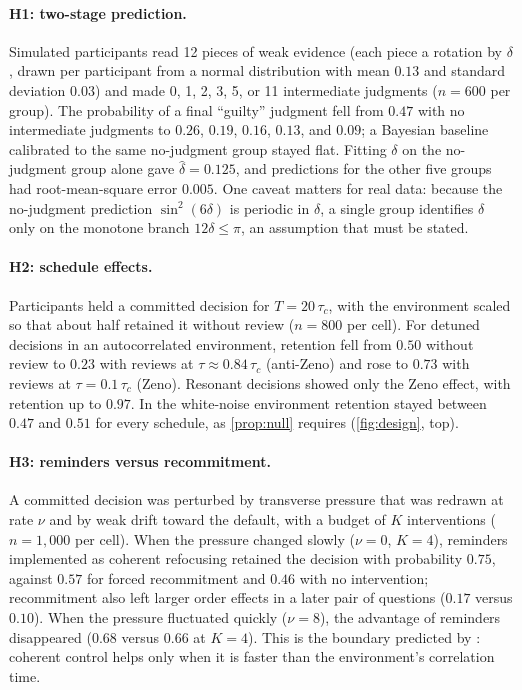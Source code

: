 \documentclass[11pt]{article}
\theoremstyle{definition}
\theoremstyle{remark}
\begin{document}
\paragraph{H1: two-stage prediction.} Simulated participants read 12 pieces of weak evidence (each piece a rotation by $\delta$, drawn per participant from a normal distribution with mean $0.13$ and standard deviation $0.03$) and made 0, 1, 2, 3, 5, or 11 intermediate judgments ($n=600$ per group). The probability of a final ``guilty'' judgment fell from $0.47$ with no intermediate judgments to $0.26$, $0.19$, $0.16$, $0.13$, and $0.09$; a Bayesian baseline calibrated to the same no-judgment group stayed flat. Fitting $\delta$ on the no-judgment group alone gave $\hat\delta=0.125$, and predictions for the other five groups had root-mean-square error $0.005$. One caveat matters for real data: because the no-judgment prediction $\sin^2(6\delta)$ is periodic in $\delta$, a single group identifies $\delta$ only on the monotone branch $12\delta\le\pi$, an assumption that must be stated.

\paragraph{H2: schedule effects.} Participants held a committed decision for $T=20\,\tau_c$, with the environment scaled so that about half retained it without review ($n=800$ per cell). For detuned decisions in an autocorrelated environment, retention fell from $0.50$ without review to $0.23$ with reviews at $\tau\approx0.84\,\tau_c$ (anti-Zeno) and rose to $0.73$ with reviews at $\tau=0.1\,\tau_c$ (Zeno). Resonant decisions showed only the Zeno effect, with retention up to $0.97$. In the white-noise environment retention stayed between $0.47$ and $0.51$ for every schedule, as \cref{prop:null} requires (\cref{fig:design}, top).

\paragraph{H3: reminders versus recommitment.} A committed decision was perturbed by transverse pressure that was redrawn at rate $\nu$ and by weak drift toward the default, with a budget of $K$ interventions ($n=1{,}000$ per cell). When the pressure changed slowly ($\nu=0$, $K=4$), reminders implemented as coherent refocusing retained the decision with probability $0.75$, against $0.57$ for forced recommitment and $0.46$ with no intervention; recommitment also left larger order effects in a later pair of questions ($0.17$ versus $0.10$). When the pressure fluctuated quickly ($\nu=8$), the advantage of reminders disappeared ($0.68$ versus $0.66$ at $K=4$). This is the boundary predicted by \citet{kofman2005}: coherent control helps only when it is faster than the environment's correlation time.
\end{document}
